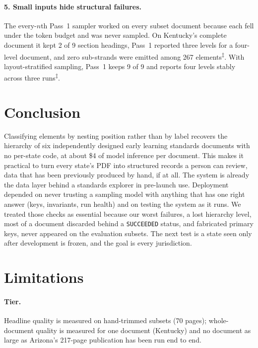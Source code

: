 \documentclass[11pt]{article}
\newcommand{\elog}{\textsuperscript{$\ddagger$}}
\begin{document}
\paragraph{5. Small inputs hide structural failures.} The every-$n$th Pass~1
sampler worked on every subset document because each fell under the token
budget and was never sampled. On Kentucky's complete document it kept 2 of 9
section headings, Pass~1 reported three levels for a four-level document, and
zero sub-strands were emitted among 267 elements\elog. With layout-stratified
sampling, Pass~1 keeps 9 of 9 and reports four levels stably across three runs\elog.

\section{Conclusion}
\label{sec:conclusion}

Classifying elements by nesting position rather than by label recovers the hierarchy of six independently designed early learning standards documents with no per-state code, at about \$4 of model inference per document. This makes it practical to turn every state's PDF into structured records a person can review, data that has been previously produced by hand, if at all. The system is already the data layer behind a standards explorer in pre-launch use.
Deployment depended on never trusting a sampling model with anything that has one right answer (keys, invariants, run health) and on testing the system as it runs. We treated those checks as essential because our worst failures, a lost hierarchy level, most of a document discarded behind a \texttt{SUCCEEDED} status, and fabricated primary keys, never appeared on the evaluation subsets. The next test is a state seen only after development is frozen, and the goal is every jurisdiction.

\section*{Limitations}
\label{sec:limitations}\label{sec:discussion-limitations}

\paragraph{Tier.} Headline quality is measured on hand-trimmed subsets (70 pages);
whole-document quality is measured for one document (Kentucky) and no
document as large as Arizona's 217-page publication has been run end to end.
\end{document}
